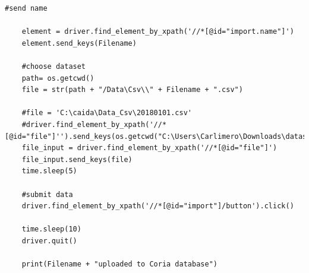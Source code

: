 \documentclass[conference, 11pt]{IEEEtran}
\begin{document}
\begin{appendices}
\begin{lstlisting}[float=*]
	#send name
	
	element = driver.find_element_by_xpath('//*[@id="import.name"]')
	element.send_keys(Filename)

	#choose dataset
	path= os.getcwd()
	file = str(path + "/Data\Csv\\" + Filename + ".csv")

	#file = 'C:\caida\Data_Csv\20180101.csv'
	#driver.find_element_by_xpath('//*[@id="file"]'').send_keys(os.getcwd("C:\Users\Carlimero\Downloads\datastructrue.txt")')
	file_input = driver.find_element_by_xpath('//*[@id="file"]')
	file_input.send_keys(file)
	time.sleep(5)

	#submit data
	driver.find_element_by_xpath('//*[@id="import"]/button').click()

	time.sleep(10)
	driver.quit()

	print(Filename + "uploaded to Coria database")
\end{lstlisting}

\end{appendices}
\end{document}
